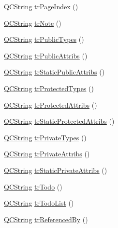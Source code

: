 \begin{DoxyCompactItemize}
\item 
\hyperlink{class_q_c_string}{Q\+C\+String} \hyperlink{class_translator_polish_a42db4bdc911414348f01b085308a8bcf}{tr\+Page\+Index} ()
\item 
\hyperlink{class_q_c_string}{Q\+C\+String} \hyperlink{class_translator_polish_ab1d3ea1e90be2151b29eec353eb59288}{tr\+Note} ()
\item 
\hyperlink{class_q_c_string}{Q\+C\+String} \hyperlink{class_translator_polish_a3e61e27332d73b4aec9c1c924b2a9f78}{tr\+Public\+Types} ()
\item 
\hyperlink{class_q_c_string}{Q\+C\+String} \hyperlink{class_translator_polish_a8c0a58e64ad24657d827673920eff201}{tr\+Public\+Attribs} ()
\item 
\hyperlink{class_q_c_string}{Q\+C\+String} \hyperlink{class_translator_polish_ac313be6e56409f028b2074706e5cb57a}{tr\+Static\+Public\+Attribs} ()
\item 
\hyperlink{class_q_c_string}{Q\+C\+String} \hyperlink{class_translator_polish_a63e9aeebb9177fd3b4c2abab7e4696fc}{tr\+Protected\+Types} ()
\item 
\hyperlink{class_q_c_string}{Q\+C\+String} \hyperlink{class_translator_polish_adc537f3a574929e235325b93881a056a}{tr\+Protected\+Attribs} ()
\item 
\hyperlink{class_q_c_string}{Q\+C\+String} \hyperlink{class_translator_polish_ab5163c1a4d298a0d3596c34b1b105eeb}{tr\+Static\+Protected\+Attribs} ()
\item 
\hyperlink{class_q_c_string}{Q\+C\+String} \hyperlink{class_translator_polish_a37a023216ee9cf2bfa8d59e669ea9c09}{tr\+Private\+Types} ()
\item 
\hyperlink{class_q_c_string}{Q\+C\+String} \hyperlink{class_translator_polish_a8a61bbdc5a5a0278c9fde54d2717dac2}{tr\+Private\+Attribs} ()
\item 
\hyperlink{class_q_c_string}{Q\+C\+String} \hyperlink{class_translator_polish_a26b2a7d25ba8fed3f33fc1d5fb676081}{tr\+Static\+Private\+Attribs} ()
\item 
\hyperlink{class_q_c_string}{Q\+C\+String} \hyperlink{class_translator_polish_af9904849177fa7423fee813a81a8a581}{tr\+Todo} ()
\item 
\hyperlink{class_q_c_string}{Q\+C\+String} \hyperlink{class_translator_polish_ab1de6749548a4afe26bff382fa459e1a}{tr\+Todo\+List} ()
\item 
\hyperlink{class_q_c_string}{Q\+C\+String} \hyperlink{class_translator_polish_a60d9c952465649cb2cd6113a942ac42e}{tr\+Referenced\+By} ()
\item 

\end{DoxyCompactItemize}
